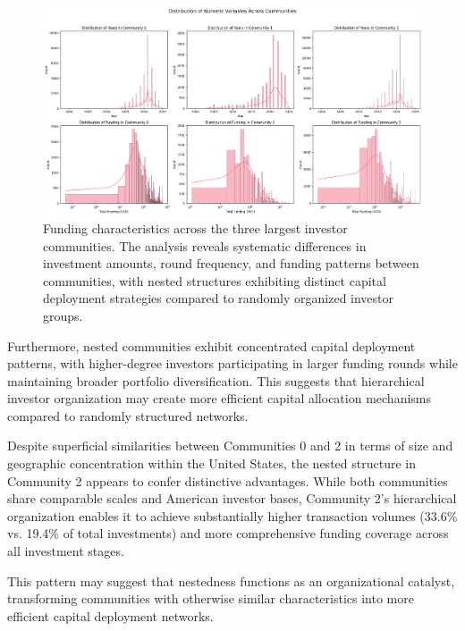 
\begin{figure}[htbp]
\centering
\includegraphics[width=1\textwidth]{./assets/funding-characteristics.png}
\caption{Funding characteristics across the three largest investor communities. The analysis reveals systematic differences in investment amounts, round frequency, and funding patterns between communities, with nested structures exhibiting distinct capital deployment strategies compared to randomly organized investor groups.}
\label{fig:funding_characteristics}
\end{figure}


Furthermore, nested communities exhibit concentrated capital deployment patterns, with higher-degree investors participating in larger funding rounds while maintaining broader portfolio diversification. This suggests that hierarchical investor organization may create more efficient capital allocation mechanisms compared to randomly structured networks.

Despite superficial similarities between Communities 0 and 2 in terms of size and geographic concentration within the United States, the nested structure in Community 2 appears to confer distinctive advantages. While both communities share comparable scales and American investor bases, Community 2's hierarchical organization enables it to achieve substantially higher transaction volumes (33.6\% vs. 19.4\% of total investments) and more comprehensive funding coverage across all investment stages. 

This pattern may suggest that nestedness functions as an organizational catalyst, transforming communities with otherwise similar characteristics into more efficient capital deployment networks.

